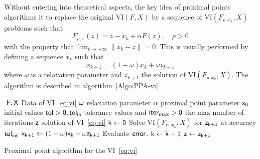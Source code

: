 Without entering into theoretical aspects, the key idea of proximal points algorithms it to replace the original $\mathrm{VI}(F,X)$ by a sequence of $\mathrm{VI}(F_{\rho,x_k},X)$  problems such that 
\begin{equation}
  \label{eq:prox-algo-1}
  F_{\rho,x}(z) = z - x_k+ \alpha F(z) , \quad \rho > 0 
\end{equation}
with the property that $\lim_{ k \rightarrow +\infty} \| x_k -z \| = 0$. This is usually performed by defining a sequence $x_k$ such that
\begin{equation}
  \label{eq:prox-algo-2}
  x_{k+1} = (1-\omega) x_{k} + \omega z_{k+1}
\end{equation}
where $\omega$ is a relaxation parameter and $z_{k+1}$ the solution of $\mathrm{VI}(F_{\rho,x_k},X)$. The algorithm is described in algorithm~\ref{Algo:PPA-vi}
\begin{algorithm}
  \begin{algorithmic}
    {\sf
      \STATE $ $
      \REQUIRE $\sf F,X$ Data of VI~\eqref{eq:vi}
      \REQUIRE $\sf \omega$ relaxation parameter
      \REQUIRE $\sf \alpha$ proximal point parameter
      \REQUIRE $\sf x_0$ initial values
      \REQUIRE $\sf tol >0, tol_{in}$ tolerance values and $\sf iter_{\max}  >0$ the max number of iterations
      \ENSURE  $\sf z$ solution of VI~\eqref{eq:vi}
      \STATE   $\sf k \leftarrow 0$ 
      \STATE Solve $\mathrm{VI}(F_{\alpha,x_k},X)$ for $\sf z_{k+1}$ at accuracy $\sf tol_{int}$
      \STATE $\sf x_{k+1} \leftarrow (1-\omega) x_{k} + \omega z_{k+1}$
      \STATE Evaluate $\sf error$.
      \STATE $\sf k \leftarrow k+1$
      \ENDWHILE
      \STATE $\sf z \leftarrow z_{k+1}$ 
    }
  \end{algorithmic}
  \caption{Proximal point algorithm for the VI~\eqref{eq:vi}}  \label{Algo:PPA-vi}
\end{algorithm}

